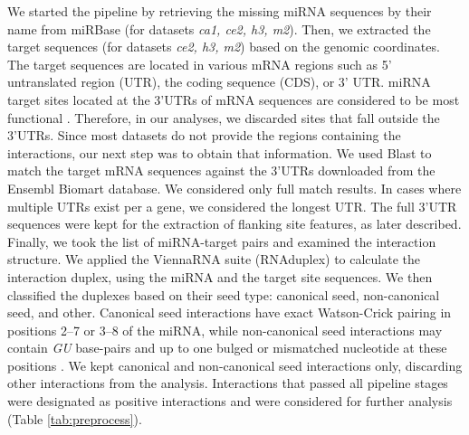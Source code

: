 We started the pipeline by retrieving the missing miRNA sequences by their name from miRBase (for datasets  \textit{ca1, ce2, h3, m2}). Then, we extracted the target sequences (for datasets \textit{ce2, h3, m2}) based on the genomic coordinates. The target sequences are located in various mRNA regions such as 5' untranslated region (UTR), the coding sequence (CDS), or 3' UTR. miRNA target sites located at the 3'UTRs of mRNA sequences are considered to be most functional \cite{menor2014mirmark, baek2008impact}. Therefore, in our analyses, we discarded sites that fall outside the 3'UTRs. Since most datasets do not provide the regions containing the interactions, our next step was to obtain that information. We used Blast \cite{altschul1990basic_blast} to match the target mRNA sequences against the 3'UTRs downloaded from the Ensembl Biomart database. We considered only full match results. In cases where multiple UTRs exist per a gene, we considered the longest UTR. The full 3'UTR sequences were kept for the extraction of flanking site features, as later described. Finally, we took the list of miRNA-target pairs and examined the interaction structure. We applied the ViennaRNA suite (RNAduplex) \cite{lorenz2011viennarna} to calculate the interaction duplex, using the miRNA and the target site sequences. We then classified the duplexes based on their seed type: canonical seed, non-canonical seed, and other. Canonical seed interactions have exact Watson-Crick pairing in positions 2–7 or 3–8 of the miRNA, while non-canonical seed interactions may contain \textit{GU} base-pairs and up to one bulged or mismatched nucleotide at these positions \cite{helwak2013mapping}. We kept canonical and non-canonical seed interactions only, discarding other interactions from the analysis.
Interactions that passed all pipeline stages were designated as positive interactions and were considered for further analysis (Table \ref{tab:preprocess}).


